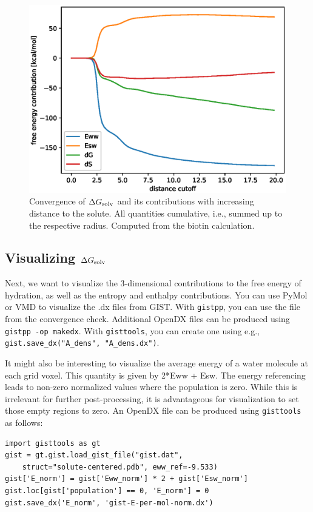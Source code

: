 \documentclass[9pt,tutorial]{livecoms}
\newcommand{\dgsolv}{\Delta G_\textup{solv}}
\newcommand{\software}{\texttt}
\newcommand\inlinecode{\texttt}
\begin{document}
\begin{figure}
	\centering
	\includegraphics[width=0.8\linewidth]{figures/A_E_S_convergence.eps}
	\caption{Convergence of $\dgsolv$ and its contributions with increasing distance to the solute. All quantities cumulative, i.e., summed up to the respective radius. Computed from the biotin calculation.}\label{fig_radial_convergence}
\end{figure}

\subsection{Visualizing $\dgsolv$}
Next, we want to visualize the 3-dimensional contributions to the free energy of hydration, as well as the entropy and enthalpy contributions.
You can use PyMol\cite{pymol} or VMD\cite{vmd} to visualize the .dx files from GIST\@.
With \software{gistpp}, you can use the file from the convergence check. Additional OpenDX files can be produced using \inlinecode{gistpp -op makedx}.
With \software{gisttools}, you can create one using e.g., \inlinecode{gist.save\_dx("A\_dens", "A\_dens.dx")}.

It might also be interesting to visualize the average energy of a water molecule at each grid voxel.
This quantity is given by 2*Eww + Esw.
The energy referencing leads to non-zero normalized values where the population is zero.
While this is irrelevant for further post-processing, it is advantageous for visualization to set those empty regions to zero.
An OpenDX file can be produced using \software{gisttools} as follows:

\begin{lstlisting}[style=python]
import gisttools as gt
gist = gt.gist.load_gist_file("gist.dat",
    struct="solute-centered.pdb", eww_ref=-9.533)
gist['E_norm'] = gist['Eww_norm'] * 2 + gist['Esw_norm']
gist.loc[gist['population'] == 0, 'E_norm'] = 0
gist.save_dx('E_norm', 'gist-E-per-mol-norm.dx')
\end{lstlisting}
\end{document}
